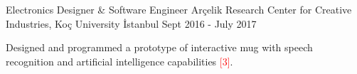 \begin{cventries}
  \cventry
    {Electronics Designer \& Software Engineer} %
    {Arçelik Research Center for Creative Industries, Koç University} %
    {İstanbul} %
    {Sept 2016 - July 2017} %
    {
      \begin{cvitems} %
      \item{Designed and programmed a prototype of interactive mug with speech recognition and artificial intelligence capabilities \textcolor{red}{[3]}.
        }
      \end{cvitems}
    }



\end{cventries}
